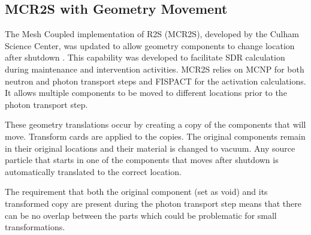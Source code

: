 
\subsection{MCR2S with Geometry Movement}
The Mesh Coupled implementation of R2S (MCR2S), developed by the Culham Science Center, 
was updated to allow geometry components to change location after shutdown
\cite{mcr2s_mov}.
This capability was developed to facilitate SDR calculation during maintenance and
intervention activities.  MCR2S relies on MCNP for both neutron and photon
transport steps and FISPACT for the activation calculations. 
It allows multiple components to be moved to
different locations prior to the photon transport step.

These geometry translations occur by creating a copy of the
components that will move.  Transform cards are applied to the copies. 
The original components remain in their original locations and their material
is changed to vacuum.  Any source particle that starts in one of the
components that moves after shutdown is automatically translated to the correct
location. %

The requirement that both the original component (set as void) and its
transformed copy are present during the photon transport step means that there
can be no overlap between the parts which could be problematic for small
transformations.

